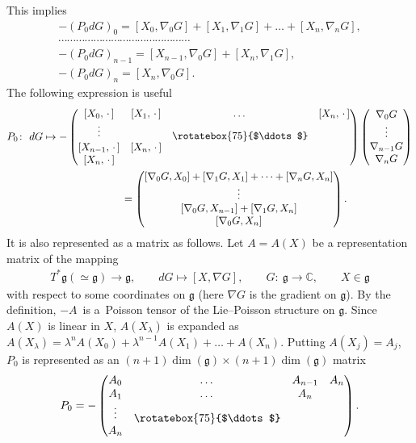 \documentclass[pdftex]{sigma}
\numberwithin{equation}{section}
\begin{document}
This implies
\begin{gather*}
-(P_0dG)_0 = [X_0, \nabla _0G]+[X_1, \nabla _1G]+ \dots + [X_n, \nabla _nG],\\
\cdots\cdots\cdots\cdots\cdots\cdots\cdots\cdots\cdots\cdots\cdots\cdots\cdots\cdots\cdots\\
-(P_0dG)_{n-1} = [X_{n-1}, \nabla _0G] + [X_n, \nabla _1G] ,\\
-(P_0dG)_{n} = [X_{n}, \nabla _0G].
\end{gather*}
The following expression is useful
\begin{gather*}
P_0\colon \ dG \mapsto - \left(
\begin{matrix}
[X_0, \,\cdot \,] & [X_1, \,\cdot \,] & \dots & [X_n, \,\cdot \,] \\
\vdots & & \raisebox{-0.1cm}{\rotatebox{75}{$\ddots$}} & \\
 [X_{n-1}, \,\cdot \,] & [X_n, \,\cdot \,] & & \\
 [X_{n}, \,\cdot \,]& & &
\end{matrix}
\right) \left(
\begin{matrix}
\nabla _0G \\
\vdots \\
\nabla _{n-1}G \\
\nabla _nG
\end{matrix}\right) \\
\hphantom{P_0\colon \ dG \mapsto}{}
 = \left(
\begin{matrix}
[\nabla _0G, X_0]+[\nabla _1G, X_1] + \dots + [\nabla _nG, X_n] \\
\vdots \\
 [\nabla _0G, X_{n-1}]+[\nabla _1G, X_n] \\
 [\nabla _0G, X_n]
\end{matrix}\right).
\end{gather*}
It is also represented as a matrix as follows. Let $A = A(X)$ be a representation matrix of the mapping
\begin{gather*}
T^* \mathfrak{g} (\simeq \mathfrak{g}) \to \mathfrak{g}, \qquad dG \mapsto [X, \nabla G],
\qquad G\colon \ \mathfrak{g} \to \mathbb{C},\qquad X\in \mathfrak{g}
\end{gather*}
with respect to some coordinates on $\mathfrak{g}$ (here $\nabla G$ is the gradient on $\mathfrak{g}$). By the def\/inition, $-A$~is a~Poisson tensor of the Lie--Poisson structure on $\mathfrak{g}$. Since $A(X)$ is linear in $X$, $A(X_\lambda )$ is expanded as $A(X_\lambda ) = \lambda ^n A(X_0) + \lambda ^{n-1}A(X_1) + \dots + A(X_n)$. Putting $A(X_j) = A_j$, $P_0$ is represented as an $(n+1)\dim (\mathfrak{g}) \times (n+1)\dim (\mathfrak{g})$ matrix
\begin{gather*}
P_0 = - \left(
\begin{matrix}
A_0 & \dots & A_{n-1} & A_n \\
A_1 & \dots & A_n & \\[0.0cm]
\vdots & \raisebox{-0.1cm}{\rotatebox{75}{$\ddots$}} & & \\
A_n & & &
\end{matrix}
\right).
\end{gather*}
\end{document}
